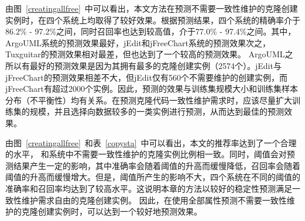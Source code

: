 由图~\ref{creatingallfree}~中可以看出，本文方法在预测不需要一致性维护的克隆创建实例时，在四个系统上均取得了较好效果。根据预测结果，四个系统的精确率介于86.2\% - 97.2\%之间，同时召回率也达到较高值，介于77.0\% - 97.4\%之间。其中，ArgoUML系统的预测效果最好，jEdit和jFreeChart系统的预测效果次之，Tuxguitar的预测效果相对最差，但也达到了一个较高的预测效果。
ArgoUML之所以有最好的预测效果是因为其拥有最多的克隆创建实例（2574个）。jEdit与jFreeChart的预测效果相差不大，但jEdit仅有560个不需要维护的创建实例，而jFreeChart有超过2000个实例。因此，预测的效果与训练集规模大小和训练集样本分布（不平衡性）均有关系。在预测克隆代码一致性维护需求时，应该尽量扩大训练集的规模，并且选择向数据较多的一类实例进行预测，从而达到最佳的预测效果。

由图~\ref{creatingallfree}~和表~\ref{copysta}~中可以看出，本文的推荐率达到了一个合理的水平， 和系统中不需要一致性维护的克隆实例比例相一致。同时，阈值会对预测结果产生一定的影响，其中准确率会随着阈值的升高而缓慢降低，召回率会随着阈值的升高而缓慢增大。但是，阈值所产生的影响不大，四个系统在不同的阈值的准确率和召回率均达到了较高水平。这说明本章的方法以较好的稳定性预测满足一致性维护需求自由的克隆创建实例。
因此，在使用全部属性预测不需要一致性维护的克隆创建实例时，可以达到一个较好地预测效果。



